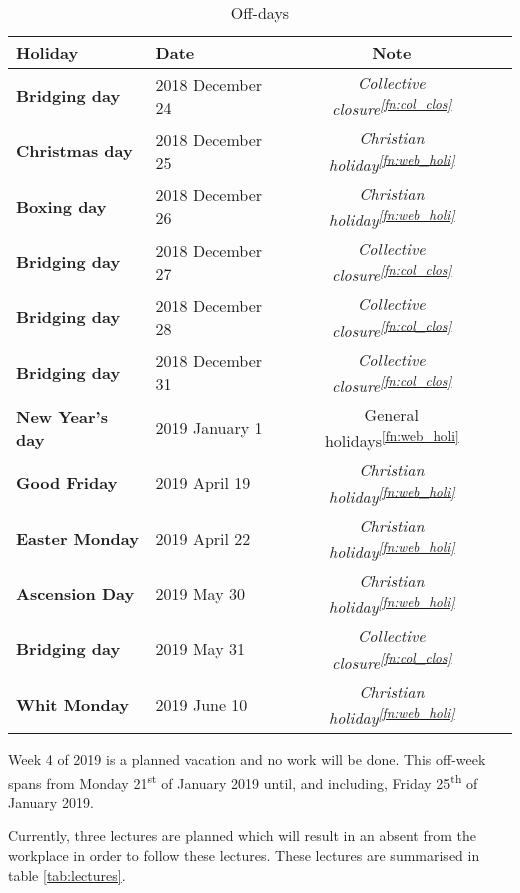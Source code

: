 \begin{table} [h!]
	\begin{tabular}{l|lcl}
		\textbf{Holiday} 		&	Date 				&	Note \\
		\hline
		\textbf{Bridging day} 	& 	2018 December 24	& \textit{Collective closure\textsuperscript{\ref{fn:col_clos}}} \\
		\rowcolor{Gray}
		\textbf{Christmas day} 	&	2018 December 25	& \textit{Christian holiday\textsuperscript{\ref{fn:web_holi}}} \\ 
		\textbf{Boxing day} 	&	2018 December 26 	& \textit{Christian holiday\textsuperscript{\ref{fn:web_holi}}} \\
		\rowcolor{Gray}
		\textbf{Bridging day} 	&	2018 December 27	& \textit{Collective closure\textsuperscript{\ref{fn:col_clos}}} \\
		\textbf{Bridging day}	&	2018 December 28	& \textit{Collective closure\textsuperscript{\ref{fn:col_clos}}} \\
		\rowcolor{Gray}
		\textbf{Bridging day}	&	2018 December 31	& \textit{Collective closure\textsuperscript{\ref{fn:col_clos}}} \\
		\textbf{New Year's day} & 	2019 January 1	 	& General holidays\textsuperscript{\ref{fn:web_holi}} \\
		\rowcolor{Gray}
		\textbf{Good Friday}	&	2019 April 19	 	& \textit{Christian holiday\textsuperscript{\ref{fn:web_holi}}} \\
		\textbf{Easter Monday}	&	2019 April 22		& \textit{Christian holiday\textsuperscript{\ref{fn:web_holi}}} \\
		\rowcolor{Gray}
		\textbf{Ascension Day}	&	2019 May 30			& \textit{Christian holiday\textsuperscript{\ref{fn:web_holi}}} \\
		\textbf{Bridging day}	&	2019 May 31			& \textit{Collective closure\textsuperscript{\ref{fn:col_clos}}} \\
		\rowcolor{Gray}
		\textbf{Whit Monday}	&	2019 June 10		& \textit{Christian holiday\textsuperscript{\ref{fn:web_holi}}} \\
		\hline
	\end{tabular}
	\caption{Off-days}
	\label{tab:offdays}
\end{table}

Week 4 of 2019 is a planned vacation and no work will be done. This off-week spans from Monday 21\textsuperscript{st} of January 2019 until, and including, Friday 25\textsuperscript{th} of January 2019.


Currently, three lectures are planned which will result in an absent from the workplace in order to follow these lectures. These lectures are summarised in table \ref{tab:lectures}.

